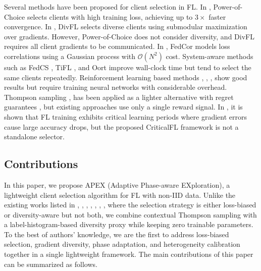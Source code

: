 \documentclass[journal]{IEEEtran}
\begin{document}
Several methods have been proposed for client selection in FL. In \cite{cho2022towards}, Power-of-Choice selects clients with high training loss, achieving up to $3\times$ faster convergence. In \cite{balakrishnan2022diverse}, DivFL selects diverse clients using submodular maximization over gradients. However, Power-of-Choice does not consider diversity, and DivFL requires all client gradients to be communicated. In \cite{tang2022fedcor}, FedCor models loss correlations using a Gaussian process with $\mathcal{O}(N^2)$ cost. System-aware methods such as FedCS \cite{nishio2019client}, TiFL \cite{chai2020tifl}, and Oort \cite{lai2021oort} improve wall-clock time but tend to select the same clients repeatedly. Reinforcement learning based methods \cite{wang2020optimizing}, \cite{zheng2024fedaeb}, \cite{dai2025fedhrl}, \cite{ning2024fedgcs} show good results but require training neural networks with considerable overhead. Thompson sampling \cite{thompson1933likelihood}, \cite{chapelle2011empirical} has been applied as a lighter alternative with regret guarantees \cite{agrawal2012analysis}, but existing approaches use only a single reward signal. In \cite{yan2023criticalfl}, it is shown that FL training exhibits critical learning periods where gradient errors cause large accuracy drops, but the proposed CriticalFL framework is not a standalone selector.

\subsection{Contributions}
In this paper, we propose APEX (Adaptive Phase-aware EXploration), a lightweight client selection algorithm for FL with non-IID data. Unlike the existing works listed in \cite{cho2022towards}, \cite{lai2021oort}, \cite{balakrishnan2022diverse}, \cite{wang2020optimizing}, \cite{zheng2024fedaeb}, \cite{dai2025fedhrl}, \cite{ning2024fedgcs}, where the selection strategy is either loss-biased or diversity-aware but not both, we combine contextual Thompson sampling with a label-histogram-based diversity proxy while keeping zero trainable parameters. To the best of authors' knowledge, we are the first to address loss-biased selection, gradient diversity, phase adaptation, and heterogeneity calibration together in a single lightweight framework. The main contributions of this paper can be summarized as follows.
\end{document}
